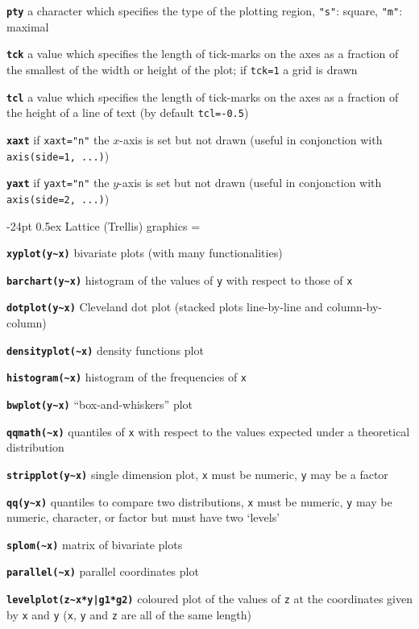 \documentclass[8pt,landscape]{article}
\makeatletter
\renewcommand\section{\@startsection{section}{1}{0mm}%
                                     {-24pt}%
                                     {0.5ex}%
                                {\color{blue}\normalfont\large\bfseries}}
\newcommand{\code}{\texttt}
\newcommand{\bcode}[1]{\texttt{\textbf{#1}}}
\makeatother
\begin{document}
\begin{multicols*}{3}
\bcode{pty}  a character which specifies the type of the plotting region, \code{"s"}: square, \code{"m"}: maximal

\bcode{tck}  a value which specifies the length of tick-marks on the axes as a fraction of the smallest of the width or height of the plot; if \code{tck=1} a grid is drawn

\bcode{tcl}  a value which specifies the length of tick-marks on the axes as a fraction of the height of a line of text (by default \code{tcl=-0.5})

\bcode{xaxt}  if \code{xaxt="n"} the $x$-axis is set but not drawn (useful in conjonction with \code{axis(side=1, ...)})

\bcode{yaxt}  if \code{yaxt="n"} the $y$-axis is set but not drawn (useful in conjonction with \code{axis(side=2, ...)})





\section{Lattice (Trellis) graphics}
\everypar={\hangindent=9mm}

\bcode{xyplot(y\~{}x)}  bivariate plots (with many functionalities)

\bcode{barchart(y\~{}x)}  histogram of the values of \code{y} with
respect to those of \code{x}

\bcode{dotplot(y\~{}x)}  Cleveland dot plot (stacked plots line-by-line
and column-by-column)

\bcode{densityplot(\~{}x)}  density functions plot

\bcode{histogram(\~{}x)}  histogram of the frequencies of \code{x}

\bcode{bwplot(y\~{}x)}  ``box-and-whiskers'' plot

\bcode{qqmath(\~{}x)}  quantiles of \code{x} with respect to the values expected under a theoretical distribution

\bcode{stripplot(y\~{}x)}  single dimension plot, \code{x} must be numeric, \code{y} may be a factor

\bcode{qq(y\~{}x)}  quantiles to compare two distributions, \code{x} must be numeric, \code{y} may be numeric, character, or factor but must have two `levels'

\bcode{splom(\~{}x)}  matrix of bivariate plots

\bcode{parallel(\~{}x)}  parallel coordinates plot

\bcode{levelplot(z\~{}x*y|g1*g2)}  coloured plot of the values of \code{z} at the coordinates given by \code{x} and \code{y} (\code{x}, \code{y} and \code{z} are all of the same length)


\end{multicols*}
\end{document}
